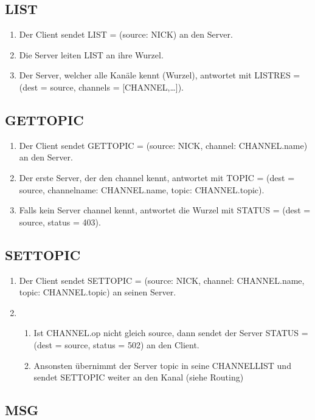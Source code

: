 \documentclass{article}
\begin{document}
\subsection{LIST}

\begin{enumerate}
  \item Der Client sendet LIST = (source: NICK) an den Server.
  \item Die Server leiten LIST an ihre Wurzel.
  \item Der Server, welcher alle Kanäle kennt (Wurzel), antwortet mit LISTRES = (dest = source, channels = [CHANNEL,\ldots]).
\end{enumerate}

\subsection{GETTOPIC}

\begin{enumerate}
  \item Der Client sendet GETTOPIC = (source: NICK, channel: CHANNEL.name) an den Server.
  \item Der erste Server, der den channel kennt, antwortet mit TOPIC = (dest = source, channelname: CHANNEL.name, topic: CHANNEL.topic).
  \item Falls kein Server channel kennt, antwortet die Wurzel mit STATUS = (dest = source, status = 403).
\end{enumerate}

\subsection{SETTOPIC}

\begin{enumerate}
  \item Der Client sendet SETTOPIC = (source: NICK, channel: CHANNEL.name, topic: CHANNEL.topic) an seinen Server.
  \item
    \begin{enumerate}
      \item Ist CHANNEL.op nicht gleich source, dann sendet der Server STATUS = (dest = source, status = 502) an den Client.
      \item Ansonsten übernimmt der Server topic in seine CHANNELLIST und sendet SETTOPIC weiter an den Kanal (siehe Routing)
    \end{enumerate}
\end{enumerate}

\subsection{MSG}
\end{document}
